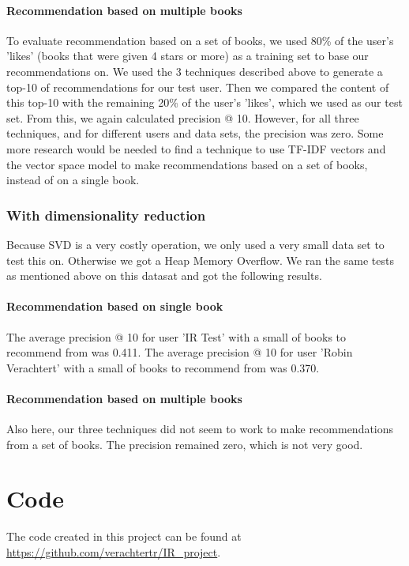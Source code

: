 \documentclass[10pt,a4paper]{paper}
\begin{document}
\paragraph{Recommendation based on multiple books}
To evaluate recommendation based on a set of books, we used 80\% of the user's 'likes' (books that were given 4 stars or more) as a training set to base our recommendations on. We used the 3 techniques described above to generate a top-10 of recommendations for our test user. Then we compared the content of this top-10 with the remaining 20\% of the user's 'likes', which we used as our test set.
From this, we again calculated precision @ 10. However, for all three techniques, and for different users and data sets, the precision was zero. Some more research would be needed to find a technique to use TF-IDF vectors and the vector space model to make recommendations based on a set of books, instead of on a single book.

\subsubsection{With dimensionality reduction}
Because SVD is a very costly operation, we only used a very small data set to test this on. Otherwise we got a Heap Memory Overflow.
We ran the same tests as mentioned above on this datasat and got the following results.

\paragraph{Recommendation based on single book}

The average precision @ 10 for user 'IR Test' with a small of books to recommend from was 0.411.
The average precision @ 10 for user 'Robin Verachtert' with a small of books to recommend from was 0.370.

\paragraph{Recommendation based on multiple books}

Also here, our three techniques did not seem to work to make recommendations from a set of books. The precision remained zero, which is not very good.

\section{Code}
The code created in this project can be found at \url{https://github.com/verachtertr/IR_project}.
\end{document}
